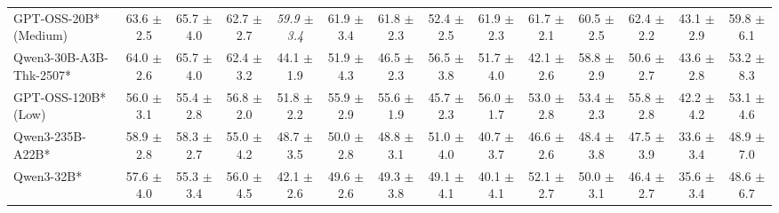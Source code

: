 \begin{table}[t]
{\begin{tabular}{l *{13}{c}}

GPT-OSS-20B* (Medium)&
63.6 {\tiny$\pm$ 2.5}&
65.7 {\tiny$\pm$ 4.0}&
62.7 {\tiny$\pm$ 2.7}&
\it{59.9} {\tiny$\pm$ 3.4}&
61.9 {\tiny$\pm$ 3.4}&
61.8 {\tiny$\pm$ 2.3}&
52.4 {\tiny$\pm$ 2.5}&
61.9 {\tiny$\pm$ 2.3}&
61.7 {\tiny$\pm$ 2.1}&
60.5 {\tiny$\pm$ 2.5}&
62.4 {\tiny$\pm$ 2.2}&
43.1 {\tiny$\pm$ 2.9}&
59.8 {\tiny$\pm$ 6.1}\\		
\rowcolor{gray!10}
 Qwen3-30B-A3B-Thk-2507* &
64.0 {\tiny$\pm$ 2.6} & 
65.7 {\tiny$\pm$ 4.0} & 
62.4 {\tiny$\pm$ 3.2} &
44.1 {\tiny$\pm$ 1.9} &
51.9 {\tiny$\pm$ 4.3} & 
46.5 {\tiny$\pm$ 2.3} & 
56.5 {\tiny$\pm$ 3.8} & 
51.7 {\tiny$\pm$ 4.0} &
42.1 {\tiny$\pm$ 2.6} & 
58.8 {\tiny$\pm$ 2.9} & 
50.6 {\tiny$\pm$ 2.7} & 
43.6 {\tiny$\pm$ 2.8} &
53.2 {\tiny$\pm$ 8.3} \\
 

GPT-OSS-120B* (Low)	&
56.0 {\tiny$\pm$ 3.1} &
55.4 {\tiny$\pm$ 2.8} &
56.8 {\tiny$\pm$ 2.0} &
51.8 {\tiny$\pm$ 2.2} &
55.9 {\tiny$\pm$ 2.9} &
55.6 {\tiny$\pm$ 1.9} &
45.7 {\tiny$\pm$ 2.3} &
56.0 {\tiny$\pm$ 1.7} &
53.0 {\tiny$\pm$ 2.8} &
53.4 {\tiny$\pm$ 2.3} &
55.8 {\tiny$\pm$ 2.8} &
42.2 {\tiny$\pm$ 4.2} &
53.1 {\tiny$\pm$ 4.6} \\	

\rowcolor{gray!10}
 Qwen3-235B-A22B* &
58.9 {\tiny$\pm$ 2.8} & 
58.3 {\tiny$\pm$ 2.7} & 
55.0 {\tiny$\pm$ 4.2} & 
48.7 {\tiny$\pm$ 3.5} &
50.0 {\tiny$\pm$ 2.8} & 
48.8 {\tiny$\pm$ 3.1} & 
51.0 {\tiny$\pm$ 4.0} & 
40.7 {\tiny$\pm$ 3.7} &
46.6 {\tiny$\pm$ 2.6} & 
48.4 {\tiny$\pm$ 3.8} & 
47.5 {\tiny$\pm$ 3.9} & 
33.6 {\tiny$\pm$ 3.4} &
48.9 {\tiny$\pm$ 7.0} \\

Qwen3-32B* &
57.6 {\tiny$\pm$ 4.0} & 
55.3 {\tiny$\pm$ 3.4} & 
56.0 {\tiny$\pm$ 4.5} & 
42.1 {\tiny$\pm$ 2.6} &
49.6 {\tiny$\pm$ 2.6} & 
49.3 {\tiny$\pm$ 3.8} & 
49.1 {\tiny$\pm$ 4.1} & 
40.1 {\tiny$\pm$ 4.1} &
52.1 {\tiny$\pm$ 2.7} & 
50.0 {\tiny$\pm$ 3.1} & 
46.4 {\tiny$\pm$ 2.7} & 
35.6 {\tiny$\pm$ 3.4} &
48.6 {\tiny$\pm$ 6.7} \\



\end{tabular}}
\end{table}
